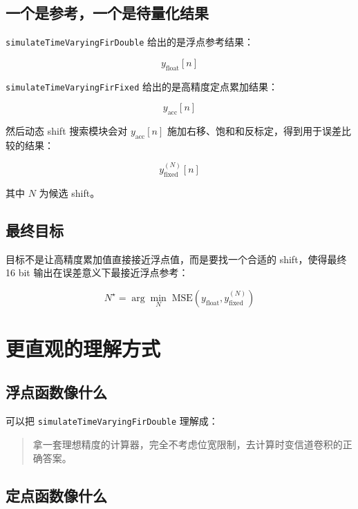 \documentclass[12pt,a4paper]{article}
\begin{document}
\subsection{一个是参考，一个是待量化结果}

\texttt{simulateTimeVaryingFirDouble} 给出的是浮点参考结果：

\begin{equation}
y_{\text{float}}[n]
\end{equation}

\texttt{simulateTimeVaryingFirFixed} 给出的是高精度定点累加结果：

\begin{equation}
y_{\text{acc}}[n]
\end{equation}

然后动态 shift 搜索模块会对 $y_{\text{acc}}[n]$ 施加右移、饱和和反标定，得到用于误差比较的结果：

\begin{equation}
y_{\text{fixed}}^{(N)}[n]
\end{equation}

其中 $N$ 为候选 shift。

\subsection{最终目标}

目标不是让高精度累加值直接接近浮点值，而是要找一个合适的 shift，使得最终 16 bit 输出在误差意义下最接近浮点参考：

\begin{equation}
N^\star = \arg\min_N \; \mathrm{MSE}\left(y_{\text{float}}, y_{\text{fixed}}^{(N)}\right)
\end{equation}

\section{更直观的理解方式}

\subsection{浮点函数像什么}

可以把 \texttt{simulateTimeVaryingFirDouble} 理解成：

\begin{quote}
拿一套理想精度的计算器，完全不考虑位宽限制，去计算时变信道卷积的正确答案。
\end{quote}

\subsection{定点函数像什么}
\end{document}
